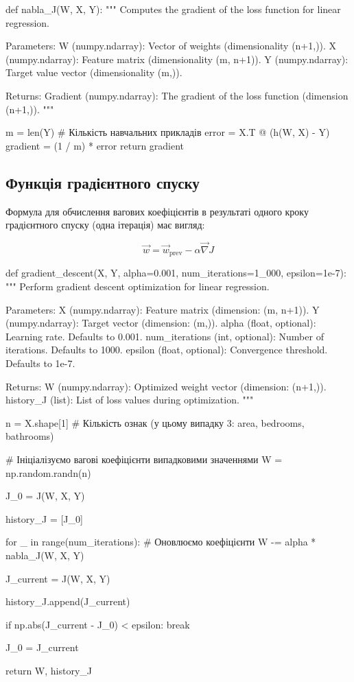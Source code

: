 \documentclass[]{article}
\newcounter{pythoncode}
\begin{document}
\begin{pythoncode}
def nabla_J(W, X, Y):
    """
    Computes the gradient of the loss function for linear regression.

    Parameters:
    W (numpy.ndarray): Vector of weights (dimensionality (n+1,)).
    X (numpy.ndarray): Feature matrix (dimensionality (m, n+1)).
    Y (numpy.ndarray): Target value vector (dimensionality (m,)).

    Returns:
    Gradient (numpy.ndarray): The gradient of the loss function (dimension (n+1,)).
    """

    m = len(Y)  # Кількість навчальних прикладів
    error  = X.T @ (h(W, X) - Y)
    gradient = (1 / m) * error
    return gradient
\end{pythoncode}

\subsection{Функція градієнтного спуску}

Формула для обчислення вагових коефіцієнтів в результаті одного кроку
градієнтного спуску (одна ітерація) має вигляд:

\[ \vec{w} = \vec{w}_{\text{prev}} - \alpha \vec{\nabla} J \]

\begin{pythoncode}
def gradient_descent(X, Y,
                     alpha=0.001,
                     num_iterations=1_000,
                     epsilon=1e-7):
    """
    Perform gradient descent optimization for linear regression.

    Parameters:
    X (numpy.ndarray): Feature matrix (dimension: (m, n+1)).
    Y (numpy.ndarray): Target vector (dimension: (m,)).
    alpha (float, optional): Learning rate. Defaults to 0.001.
    num_iterations (int, optional): Number of iterations. Defaults to 1000.
    epsilon (float, optional): Convergence threshold. Defaults to 1e-7.

    Returns:
    W (numpy.ndarray): Optimized weight vector (dimension: (n+1,)).
    history_J (list): List of loss values during optimization.
    """

    n = X.shape[1]  # Кількість ознак (у цьому випадку 3: area, bedrooms, bathrooms)

    # Ініціалізуємо вагові коефіцієнти випадковими значеннями
    W = np.random.randn(n)

    J_0 = J(W, X, Y)

    history_J = [J_0]

    for _ in range(num_iterations):
        # Оновлюємо коефіцієнти
        W -= alpha * nabla_J(W, X, Y)

        J_current = J(W, X, Y)

        history_J.append(J_current)

        if np.abs(J_current - J_0) < epsilon:
            break

        J_0 = J_current


    return W, history_J
\end{pythoncode}
\end{document}
